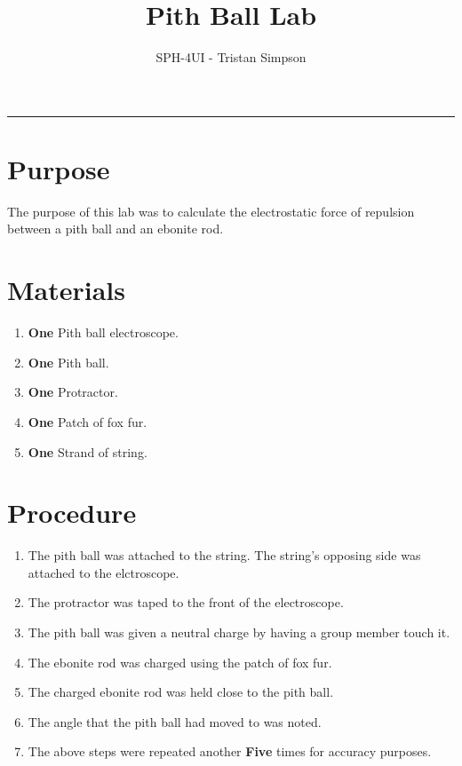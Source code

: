 \documentclass{article}
\title{Pith Ball Lab}
\author{SPH-4UI - Tristan Simpson}
\begin{document}
\maketitle

\vspace{0.5cm}
\hrule
\vspace{0.5cm}
\section*{Purpose}
The purpose of this lab was to calculate the electrostatic force of repulsion between a pith ball and an ebonite rod.

\section*{Materials}
\begin{enumerate}
    \item {\textbf{One} Pith ball electroscope.}
    \item {\textbf{One} Pith ball.}
    \item {\textbf{One} Protractor.}
    \item {\textbf{One} Patch of fox fur.}
    \item {\textbf{One} Strand of string.}
\end{enumerate}

\section*{Procedure}
\begin{enumerate}
    \item {The pith ball was attached to the string. The string's opposing side was attached to the elctroscope.}
    \item {The protractor was taped to the front of the electroscope.}
    \item {The pith ball was given a neutral charge by having a group member touch it.}
    \item {The ebonite rod was charged using the patch of fox fur.}
    \item {The charged ebonite rod was held close to the pith ball.}
    \item {The angle that the pith ball had moved to was noted.}
    \item {The above steps were repeated another \textbf{Five} times for accuracy purposes.}
\end{enumerate}\leavevmode
\end{document}
